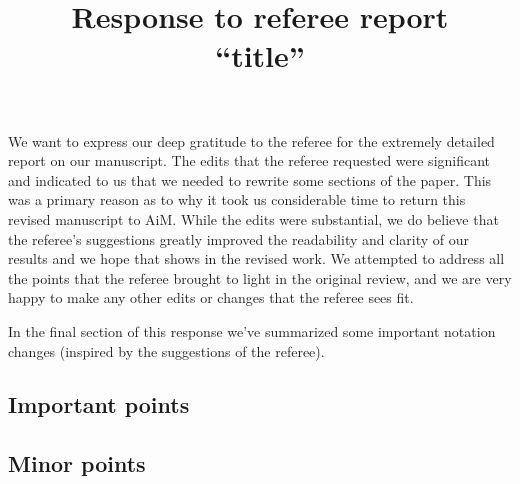 \documentclass{amsart}
\begin{document}
\title{Response to referee report \\ ``title''}

\maketitle

We want to express our deep gratitude to the referee for the extremely detailed report on our manuscript. 
The edits that the referee requested were significant and indicated to us that we needed to rewrite some sections of the paper. 
This was a primary reason as to why it took us considerable time to return this revised manuscript to AiM.
While the edits were substantial, we do believe that the referee's suggestions greatly improved the readability and clarity of our results and we hope that shows in the revised work.
We attempted to address all the points that the referee brought to light in the original review, and we are very happy to make any other edits or changes that the referee sees fit. 

In the final section of this response we've summarized some important notation changes (inspired by the suggestions of the referee).

\subsection*{Important points}
\begin{enumerate}
\end{enumerate}

\subsection*{Minor points}
\begin{enumerate}
\end{enumerate}
\end{document}
